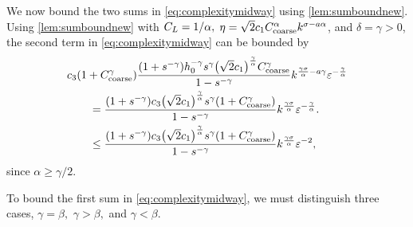 We now bound the two sums in \cref{eq:complexitymidway} using \cref{lem:sumboundnew}. Using \cref{lem:sumboundnew} with $C_{L} = 1/\alpha,$ $\eta = \sqrt{2}c_{1}C_{\mathrm{coarse}}^\alpha k^{\sigma - a\alpha}$, and $\delta = \gamma>0$, the second term in \eqref{eq:complexitymidway} can be bounded by %
\begin{align}
&\cth \mleft(1+\Ccoarse^{\gamma}\mright)\frac{\mleft(1+s^{-\gamma}\mright)  \hz^{-\gamma} s^\gamma \mleft(\sqrt{2}\co\mright)^{\frac\gamma\alpha} \Ccoarse^\gamma}{1-s^{-\gamma}} k^{\frac{\gamma\sigma}\alpha-a\gamma} \eps^{-\frac\gamma\alpha}\nonumber\\
  &\quad\quad= \frac{\mleft(1+s^{-\gamma}\mright)\cth \mleft(\sqrt{2}\co\mright)^{\frac\gamma\alpha} s^\gamma \mleft(1+\Ccoarse^{\gamma}\mright)}{1-s^{-\gamma}} k^{\frac{\gamma\sigma}\alpha} \eps^{-\frac\gamma\alpha}.\nonumber\\
  &\quad\quad\leq \frac{\mleft(1+s^{-\gamma}\mright)\cth \mleft(\sqrt{2}\co\mright)^{\frac\gamma\alpha} s^\gamma \mleft(1+\Ccoarse^{\gamma}\mright)}{1-s^{-\gamma}} k^{\frac{\gamma\sigma}\alpha} \eps^{-2},\label{eq:firstterm}
\end{align}
since $\alpha \geq \gamma/2.$

To bound the first sum in \eqref{eq:complexitymidway}, we must distinguish three cases, $\gamma=\beta,$ $\gamma > \beta,$ and $\gamma < \beta.$


